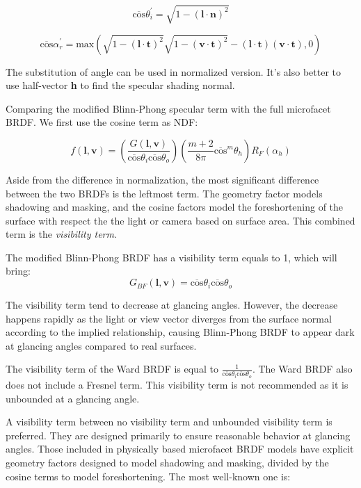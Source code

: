 \documentclass[10pt, a4paper]{article}
\begin{document}
        $$\overline{\text{cos}}\theta_i^{'} = \sqrt{1 - (\textbf{l}\cdot\textbf{n})^2}$$

        $$\overline{\text{cos}}\alpha_r^{'} = \text{max}(\sqrt{1 - (\textbf{l}\cdot\textbf{t})^2}\sqrt{1 - (\textbf{v}\cdot\textbf{t})^2} - (\textbf{l}\cdot\textbf{t})(\textbf{v}\cdot\textbf{t}), 0)$$

        The substitution of angle can be used in normalized version. It's also better to use half-vector \textbf{h} to find the specular shading normal. 

        
        \bigskip 
        \bigskip


        Comparing the modified Blinn-Phong specular term with the full microfacet BRDF. We first use the cosine term as NDF:

        $$f(\textbf{l}, \textbf{v}) = (\frac{G(\textbf{l}, \textbf{v})}{\overline{\text{cos}}\theta_i\overline{\text{cos}}\theta_o})(\frac{m + 2}{8\pi}\overline{\text{cos}}^m\theta_h)R_F(\alpha_h)$$

        Aside from the difference in normalization, the most significant difference between the two BRDFs is the leftmost term. The geometry factor models shadowing and masking, and the cosine factors model the foreshortening of the surface with respect the the light or camera based on surface area. This combined term is the \emph{visibility term}.

        The modified Blinn-Phong BRDF has a visibility term equals to 1, which will bring: 
        $$G_{BF}(\textbf{l}, \textbf{v}) = \overline{\text{cos}}\theta_i\overline{\text{cos}}\theta_o$$
            
        The visibility term tend to decrease at glancing angles. However, the decrease happens rapidly as the light or view vector diverges from the surface normal according to the implied relationship, causing Blinn-Phong BRDF to appear dark at glancing angles compared to real surfaces. 

        The visibility term of the Ward BRDF is equal to $\frac{1}{\overline{\text{cos}}\theta_i\overline{\text{cos}}\theta_o}$. The Ward BRDF also does not include a Fresnel term. This visibility term is not recommended as it is unbounded at a glancing angle.   

        A visibility term between no visibility term and unbounded visibility term is preferred. They are designed primarily to ensure reasonable behavior at glancing angles. Those included in physically based microfacet BRDF models have explicit geometry factors designed to model shadowing and masking, divided by the cosine terms to model foreshortening. The most well-known one is: 
\end{document}
